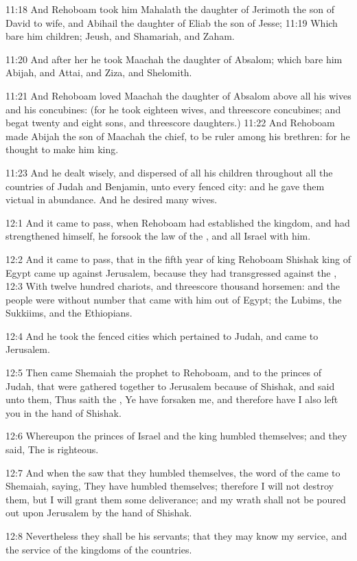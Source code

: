11:18 And Rehoboam took him Mahalath the daughter of Jerimoth the son
of David to wife, and Abihail the daughter of Eliab the son of Jesse;
11:19 Which bare him children; Jeush, and Shamariah, and Zaham.

11:20 And after her he took Maachah the daughter of Absalom; which
bare him Abijah, and Attai, and Ziza, and Shelomith.

11:21 And Rehoboam loved Maachah the daughter of Absalom above all his
wives and his concubines: (for he took eighteen wives, and threescore
concubines; and begat twenty and eight sons, and threescore
daughters.)  11:22 And Rehoboam made Abijah the son of Maachah the
chief, to be ruler among his brethren: for he thought to make him
king.

11:23 And he dealt wisely, and dispersed of all his children
throughout all the countries of Judah and Benjamin, unto every fenced
city: and he gave them victual in abundance. And he desired many
wives.

12:1 And it came to pass, when Rehoboam had established the kingdom,
and had strengthened himself, he forsook the law of the \LORD, and all
Israel with him.

12:2 And it came to pass, that in the fifth year of king Rehoboam
Shishak king of Egypt came up against Jerusalem, because they had
transgressed against the \LORD, 12:3 With twelve hundred chariots, and
threescore thousand horsemen: and the people were without number that
came with him out of Egypt; the Lubims, the Sukkiims, and the
Ethiopians.

12:4 And he took the fenced cities which pertained to Judah, and came
to Jerusalem.

12:5 Then came Shemaiah the prophet to Rehoboam, and to the princes of
Judah, that were gathered together to Jerusalem because of Shishak,
and said unto them, Thus saith the \LORD, Ye have forsaken me, and
therefore have I also left you in the hand of Shishak.

12:6 Whereupon the princes of Israel and the king humbled themselves;
and they said, The \LORD is righteous.

12:7 And when the \LORD saw that they humbled themselves, the word of
the \LORD came to Shemaiah, saying, They have humbled themselves;
therefore I will not destroy them, but I will grant them some
deliverance; and my wrath shall not be poured out upon Jerusalem by
the hand of Shishak.

12:8 Nevertheless they shall be his servants; that they may know my
service, and the service of the kingdoms of the countries.

